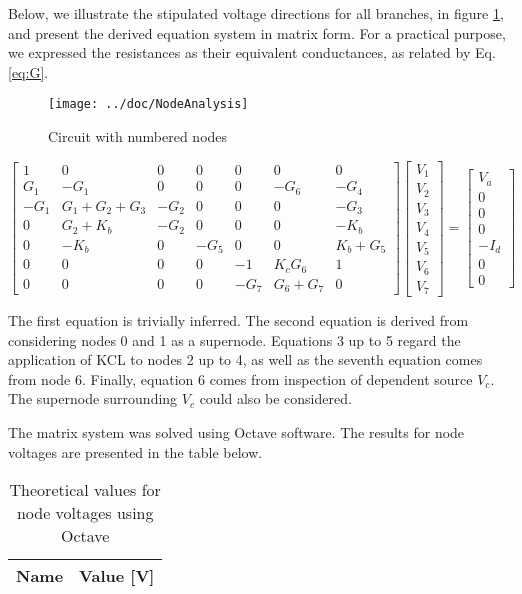 Below, we illustrate the stipulated voltage directions for all branches, in figure \ref{fig:fignode}, and present the derived equation system in matrix form. For a practical purpose, we expressed the resistances as their equivalent conductances, as related by Eq.\ref{eq:G}.


\begin{figure}[H]
  \centering
  \texttt{[image: ../doc/NodeAnalysis]}
  \caption{Circuit with numbered nodes}
  \label{fig:fignode}
\end{figure}


\begin{equation*}
\begin{bmatrix}
 1 & 0 & 0 & 0 & 0 & 0 & 0 \\
 G_1 & -G_1 & 0 & 0 & 0 & -G_6 & -G_4 \\
 -G_1 & G_1+G_2+G_3 & -G_2 & 0 & 0 & 0 & -G_3\\
 0 & G_2+K_b & -G_2 & 0 & 0 & 0 & -K_b\\
 0 & -K_b & 0 & -G_5 & 0 & 0 & K_b+G_5\\
 0 & 0 & 0 & 0 & -1 & K_cG_6 & 1\\
 0 & 0 & 0 & 0 & -G_7 & G_6+G_7 & 0\end{bmatrix}
\begin{bmatrix}
 V_1\\ V_2\\ V_3\\ V_4\\ V_5\\ V_6\\ V_7\end{bmatrix}
=
\begin{bmatrix}
 V_a\\ 0\\ 0\\ 0\\ -I_d\\ 0\\ 0 \end{bmatrix}
\end{equation*}

\par The first equation is trivially inferred. The second equation is derived from considering nodes 0 and 1 as a supernode. Equations 3 up to 5 regard the application of KCL to nodes 2 up to 4, as well as the seventh equation comes from node 6. Finally, equation 6 comes from inspection of dependent source $V_c$. The supernode surrounding $V_c$ could also be considered.

\par The matrix system was solved using Octave software. The results for node voltages are presented in the table below.


\begin{table}[H]
  \centering
  \begin{tabular}{|l|r|}
    \hline
    {\bf Name} & {\bf Value [V]} \\ \hline
  \end{tabular}
  \caption{Theoretical values for node voltages using Octave}
  \label{tab:TVoltages}
\end{table}
